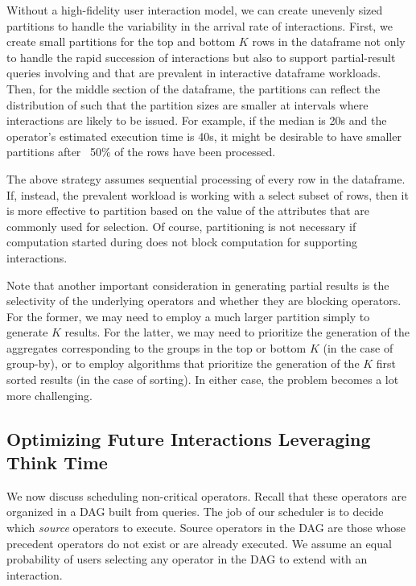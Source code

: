 \newpage
Without a high-fidelity user interaction model, we can create unevenly sized partitions to handle the variability in the arrival rate of interactions. First, we create small partitions for the top and bottom $K$ rows in the dataframe not only to handle the rapid succession of interactions but also to support partial-result queries involving  and  that are prevalent in interactive dataframe workloads. Then, for the middle section of the dataframe, the partitions can reflect the distribution of \thinktime such that the partition sizes are smaller at intervals where interactions are likely to be issued. For example, if the median \thinktime is 20s and the operator's estimated execution time is 40s, it might be desirable to have smaller partitions after ~50\% of the rows have been processed. 

The above strategy assumes sequential processing of every row in the dataframe. If, instead, the prevalent workload is working with a select subset of rows, then it is more effective to partition based on the value of the attributes that are commonly used for selection. Of course, partitioning is not necessary if computation started during \thinktime does not block computation for supporting interactions. 

Note that another important consideration in generating partial results is the selectivity
of the underlying operators and whether they are blocking operators. For the former, we may need
to employ a much larger partition simply
to generate $K$ results.
For the latter, we may need to prioritize the
generation of the aggregates corresponding to
the groups in the top or bottom $K$ (in the case
of group-by), or to employ algorithms 
that prioritize the generation of the $K$ first
sorted results (in the case of sorting).
In either case, the problem becomes a lot more 
challenging. 

\subsection{Optimizing Future Interactions Leveraging Think Time}
\label{sec:non-critical}

 We now discuss scheduling non-critical operators. 
Recall that these operators are organized in a DAG built from queries. 
The job of our scheduler is to decide which \textit{source} operators to execute. 
Source operators in the DAG are those whose precedent operators 
do not exist or are already executed. 
We assume an equal probability of users selecting any operator in the DAG to extend with an interaction. 

